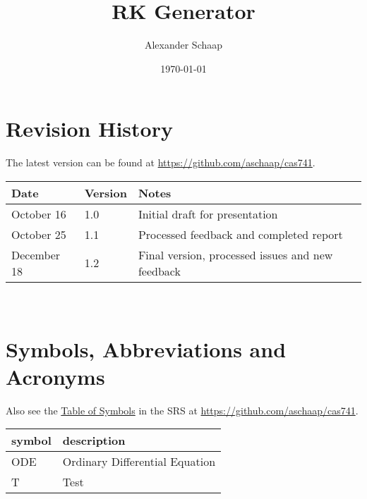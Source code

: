 \documentclass[12pt, titlepage]{article}
\begin{document}
\title{RK Generator} 
\author{Alexander Schaap}
\date{\today}
	
\maketitle


\section{Revision History}
The latest version can be found at \url{https://github.com/aschaap/cas741}.\\

\noindent
\begin{tabularx}{\textwidth}{p{3cm}p{2cm}X}
\toprule {\bf Date} & {\bf Version} & {\bf Notes}\\
\midrule
October 16 & 1.0 & Initial draft for presentation\\
October 25 & 1.1 & Processed feedback and completed report\\
December 18 & 1.2 & Final version, processed issues and new feedback\\
\bottomrule
\end{tabularx}

~\newpage

\section{Symbols, Abbreviations and Acronyms}
Also see the \href{../SRS/CA.pdf#ssec:symbols}{Table of Symbols} in the SRS at 
\url{https://github.com/aschaap/cas741}.\\

\noindent
\renewcommand{\arraystretch}{1.2}
\begin{tabular}{l l} 
  \toprule		
  \textbf{symbol} & \textbf{description}\\
  \midrule 
  ODE & Ordinary Differential Equation\\
  T & Test\\
  \bottomrule
\end{tabular}\\


\newpage

\tableofcontents


\end{document}
